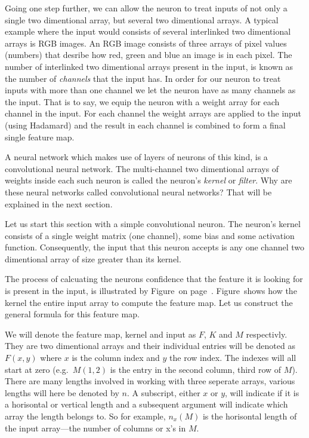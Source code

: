 Going one step further, we can allow the neuron to treat inputs of not only a single two dimentional array, but several two dimentional arrays.
A typical example where the input would consists of several interlinked two dimentional arrays is RGB images.
An RGB image consists of three arrays of pixel values (numbers) that desribe how red, green and blue an image is in each pixel.
The number of interlinked two dimentional arrays present in the input, is known as the number of {\em channels} that the input has.
In order for our neuron to treat inputs with more than one channel we let the neuron have as many channels as the input.
That is to say, we equip the neuron with a weight array for each channel in the input.
For each channel the weight arrays are applied to the input (using Hadamard) and the result in each channel is combined to form a final single feature map.

A neural network which makes use of layers of neurons of this kind, is a convolutional neural network.
The multi-channel two dimentional arrays of weights inside each such neuron is called the neuron's {\em kernel} or {\em filter}.
Why are these neural networks called convolutional neural networks?
That will be explained in the next section.

\startsubsection[title=The convolutional neuron]
Let us start this section with a simple convolutional neuron.
The neuron's kernel consists of a single weight matrix (one channel), some bias and some activation function.
Consequently, the input that this neuron accepts is any one channel two dimentional array of size greater than its kernel.

The process of calcuating the neurons  confidence that the feature it is looking for is present in the input, is illustrated by Figure~ on page~.
Figure~ shows how the kernel  the entire input array to compute the feature map.
Let us construct the general formula for this feature map.

We will denote the feature map, kernel and input as $F$, $K$ and $M$ respectivly.
They are two dimentional arrays and their individual entries will be denoted as $F(x,y)$ where $x$ is the column index and $y$ the row index.
The indexes will all start at zero (e.g.\ $M(1,2)$ is the entry in the second column, third row of $M$).
There are many lengths involved in working with three seperate arrays, various lengths will here be denoted by $n$.
A subscript, either $x$ or $y$, will indicate if it is a horisontal or vertical length and a subsequent argument will indicate which array the length belongs to.
So for example, $n_x(M)$ is the horisontal length of the input array---the number of columns or x's in $M$.

